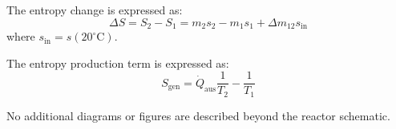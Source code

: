 The entropy change is expressed as:  
\[
\Delta S = S_2 - S_1 = m_2 s_2 - m_1 s_1 + \Delta m_{12} s_{\text{in}}
\]  
where \( s_{\text{in}} = s(20^\circ\text{C}) \).

The entropy production term is expressed as:  
\[
S_{\text{gen}} = \dot{Q}_{\text{aus}} \frac{1}{T_2} - \frac{1}{T_1}
\]  

No additional diagrams or figures are described beyond the reactor schematic.